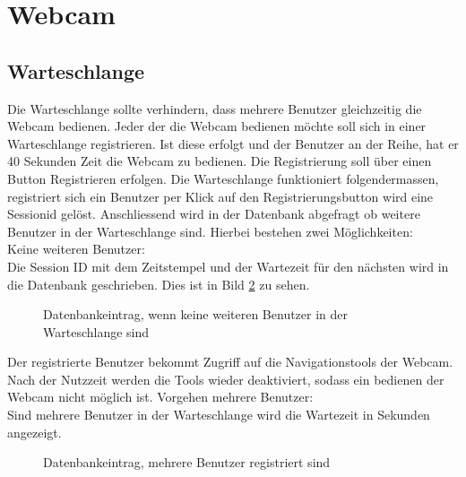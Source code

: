 \section{Webcam}

\subsection{Warteschlange}
Die Warteschlange sollte verhindern, dass mehrere Benutzer gleichzeitig die Webcam bedienen. Jeder der die Webcam bedienen möchte soll sich in einer Warteschlange registrieren. Ist diese erfolgt und der Benutzer an der Reihe, hat er 40 Sekunden Zeit die Webcam zu bedienen. Die Registrierung soll über einen Button Registrieren erfolgen. Die Warteschlange funktioniert folgendermassen, registriert sich ein Benutzer per Klick auf den Registrierungsbutton wird eine Sessionid gelöst. Anschliessend wird in der Datenbank abgefragt ob weitere Benutzer in der Warteschlange sind. Hierbei bestehen zwei Möglichkeiten:\\

Keine weiteren Benutzer:\\
Die Session ID mit dem Zeitstempel und der Wartezeit für den nächsten wird in die Datenbank geschrieben. Dies ist in Bild \ref{img:tblqueue} zu sehen.
\begin{figure}[h!]
	\centering
	\caption{Datenbankeintrag, wenn keine weiteren Benutzer in der Warteschlange sind}
	\label{img:tblqueue}
\end{figure}

Der registrierte Benutzer bekommt Zugriff auf die Navigationstools der Webcam. Nach der Nutzzeit werden die Tools wieder deaktiviert, sodass ein bedienen der Webcam nicht möglich ist. 
Vorgehen mehrere Benutzer:\\

Sind mehrere Benutzer in der Warteschlange wird die Wartezeit in Sekunden angezeigt. 
\begin{figure}[h!]
	\centering
	\caption{Datenbankeintrag, mehrere Benutzer registriert sind}
	\label{img:tblqueue}
\end{figure}


